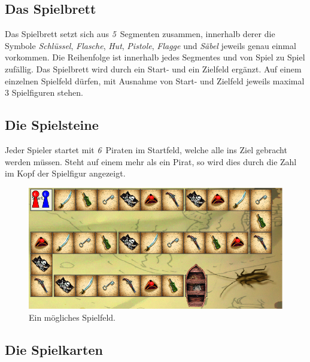 \documentclass[a4paper, ngerman]{scrartcl}
\newcommand{\SpielSegmenteAnzahl}{\emph{5}}
\newcommand{\PiratenAnzahl}{\emph{6}}
\begin{document}
	\subsection{Das Spielbrett}
	Das Spielbrett setzt sich aus \SpielSegmenteAnzahl\ Segmenten zusammen,
	innerhalb derer die Symbole \emph{Schlüssel}, \emph{Flasche}, \emph{Hut},
	\emph{Pistole}, \emph{Flagge} und \emph{Säbel} jeweils genau einmal vorkommen.
	Die Reihenfolge ist innerhalb jedes Segmentes und von Spiel zu Spiel zufällig.
	Das Spielbrett wird durch ein Start- und ein Zielfeld ergänzt.
	Auf einem einzelnen Spielfeld dürfen, mit Ausnahme von Start- und Zielfeld
	jeweils maximal 3 Spielfiguren stehen.
	\subsection{Die Spielsteine}
	Jeder Spieler startet mit \PiratenAnzahl\ Piraten im Startfeld, welche alle ins
	Ziel gebracht werden müssen. Steht auf einem mehr als ein Pirat, so wird dies
	durch die Zahl im Kopf der Spielfigur angezeigt.
	\begin{figure}[h]
		\label{fig:Spielfeld}
		\centering
		\includegraphics[scale = 0.5]{bilder/Spielfeld}
		\caption{Ein mögliches Spielfeld.}
	\end{figure}
	
	\subsection{Die Spielkarten}
	
\end{document}
